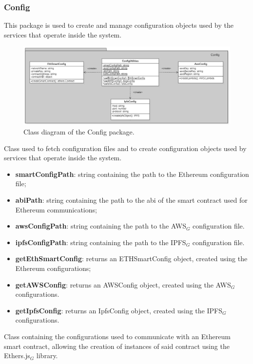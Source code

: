 	\subsubsection{Config}
	This package is used to create and manage configuration objects used by the services that operate inside the system.
	\begin{figure} [h!]
		\centering
		\includegraphics[width=1\linewidth]{diagrammi/etherless-server/Config}
		\caption{Class diagram of the Config package.}
	\end{figure}
	Class used to fetch configuration files and to create configuration objects used by services that operate inside the system.
	\begin{itemize}
		\item \textbf{smartConfigPath}: string containing the path to the Ethereum configuration file;
		\item \textbf{abiPath}: string containing the path to the abi of the smart contract used for Ethereum communications;
		\item \textbf{awsConfigPath}: string containing the path to the AWS$_{G}$ configuration file.
		\item \textbf{ipfsConfigPath}: string containing the path to the IPFS$_{G}$ configuration file.
	\end{itemize}
	\begin{itemize}
		\item \textbf{getEthSmartConfig}: returns an ETHSmartConfig object, created using the Ethereum configurations;
		\item \textbf{getAWSConfig}: returns an AWSConfig object, created using the AWS$_{G}$ configurations.
		\item \textbf{getIpfsConfig}: returns an IpfsConfig object, created using the IPFS$_{G}$ configurations.
	\end{itemize}
	Class containing the configurations used to communicate with an Ethereum smart contract, allowing the creation of instances of said contract using the Ethers.js$_{G}$ library.
